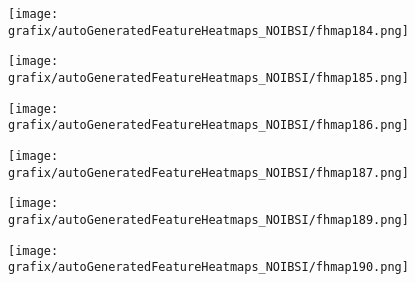 \hspace{\hsp} 
\begin{subfigure}{\wid\textwidth} 
    \centering 
    \caption{\tiny \sffamily {}} 
    \vspace{\vsp} 
    \texttt{[image: grafix/autoGeneratedFeatureHeatmaps\_NOIBSI/fhmap184.png]} 
\end{subfigure} 
\hspace{\hsp} 
\begin{subfigure}{\wid\textwidth} 
    \centering 
    \caption{\tiny \sffamily {}} 
    \vspace{\vsp} 
    \texttt{[image: grafix/autoGeneratedFeatureHeatmaps\_NOIBSI/fhmap185.png]} 
\end{subfigure} 
\hspace{\hsp} 
\begin{subfigure}{\wid\textwidth} 
    \centering 
    \caption{\tiny \sffamily {}} 
    \vspace{\vsp} 
    \texttt{[image: grafix/autoGeneratedFeatureHeatmaps\_NOIBSI/fhmap186.png]} 
\end{subfigure} 
\hspace{\hsp} 
\begin{subfigure}{\wid\textwidth} 
    \centering 
    \caption{\tiny \sffamily {}} 
    \vspace{\vsp} 
    \texttt{[image: grafix/autoGeneratedFeatureHeatmaps\_NOIBSI/fhmap187.png]} 
\end{subfigure} 
\hspace{\hsp} 
\begin{subfigure}{\wid\textwidth} 
    \centering 
    \caption{\small \sffamily {}} 
\end{subfigure} 
\hspace{\hsp} 
\begin{subfigure}{\wid\textwidth} 
    \centering 
    \caption{\tiny \sffamily {}} 
    \vspace{\vsp} 
    \texttt{[image: grafix/autoGeneratedFeatureHeatmaps\_NOIBSI/fhmap189.png]} 
\end{subfigure} 
\hspace{\hsp} 
\begin{subfigure}{\wid\textwidth} 
    \centering 
    \caption{\tiny \sffamily {}} 
    \vspace{\vsp} 
    \texttt{[image: grafix/autoGeneratedFeatureHeatmaps\_NOIBSI/fhmap190.png]} 
\end{subfigure} 
